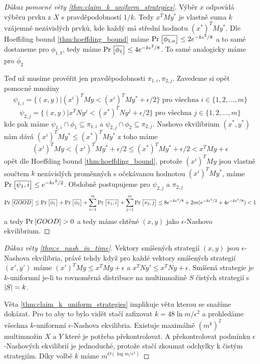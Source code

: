 \begin{proof}[Důkaz pomocné věty \ref{thm:claim_k_uniform_strategies}]
Výběr $x$ odpovídá výběru prvku z $X$ s pravděpodobností $1/k$. 
Tedy $x^T M y^*$ je vlastně suma $k$ vzájemně nezávislých prvků, kde každý má střední hodnotu $(x^*)^T M y^*$. 
Dle Hoeffding bound \ref{thm:hoeffding_bound} máme $\text{Pr}_{}\left[\overline{\phi_{1,a}}\right] \leq  2e^{-k\epsilon^2 /8}$ a to samé dostaneme pro $\phi_{1,b}$, tedy máme $\text{Pr}_{}\left[\overline{\phi_1}\right] \leq 4e^{-k \epsilon^2 /8}$. 
To samé analogicky máme pro $\overline{\phi_2}$

Teď už musíme prověřit jen pravděpodobnosti $\pi_{1,i}, \pi_{2,j}$. Zavedeme si opět pomocné množiny 
$$ 
\psi_{1,i} = \{ (x,y) | (x^i)^T M y < (x^i)^T M y^* + \epsilon/2 \} \text{ pro všechna } i \in \{1,2, \dots, m\}
$$ 
$$ 
\psi_{2,j} = \{ (x,y) | x^T N y^j < (x^*)^T N y^j + \epsilon/2 \} \text{ pro všechna } j \in \{1,2, \dots, m\}
$$
kde pak máme $\psi_{1,i} \cap \phi_1 \subseteq \pi_{1,i}$ a $\psi_{2,j} \cap \phi_2 \subseteq \pi_{2,j}$. 
Nashovo ekvilibrium $(x^*,y^*)$ nám dává $(x^i)^T M y^* \leq (x^*)^T M y^*$ z toho máme 
$$ 
(x^i)^T M y < (x^i)^T M y^* + \epsilon/2 \leq (x^*)^T M y^* + \epsilon /2 < x^T M y + \epsilon 
$$
opět dle Hoeffding bound \ref{thm:hoeffding_bound}, protože $(x^i)^T M y$ jsou vlastně součtem $k$ nezávislých proměnných s očekávanou hodnotou $(x^i)^T M y^*$, máme $\text{Pr}_{}\left[\overline{\psi_1,i}\right] \leq e^{-k \epsilon^2 /2}$. 
Obdobně postupujeme pro $\psi_{2,j}$ a $\pi_{2,j}$
$$
\text{Pr}_{}\left[\overline{GOOD}\right] \leq \text{Pr}_{}\left[\overline{\phi_1}\right] + \text{Pr}_{}\left[\overline{\phi_2}\right] + \sum^m_{i=1} \text{Pr}_{}\left[\overline{\pi_1,i}\right]  + \sum^m_{j=1} \text{Pr}_{}\left[\overline{\pi_2,j}\right] \leq 8e^{-k \epsilon^2 /8} + 2m( e^{-k \epsilon^2 /2} +  4e^{-k \epsilon^2 /8})<1
$$
a tedy $\text{Pr}_{}\left[GOOD\right]>0$ a tedy máme chtěné $(x,y)$ jako $\epsilon$-Nashovo ekvilibrium.
\end{proof}

\begin{proof}[Důkaz věty \ref{thm:e_nash_in_time}]
   Vektory smíšených strategií $(x,y)$ jsou $\epsilon$-Nashova ekvilibria, právě tehdy když pro každé vektory smíšených strategií $(x',y')$ máme $(x')^T M y \leq x^T M y + \epsilon$ a $x^T N y' \leq x^T N y + \epsilon$. 
   Smíšená strategie je $k$-uniformní je-li to rovnoměrná distribuce na multimnožině $S$ čistých strategií s $\left|S\right| = k$. 

   Věta \ref{thm:claim_k_uniform_strategies} implikuje větu kterou se snažíme dokázat. 
   Pro to aby to bylo vidět stačí zafixovat $k = 48 \ln m/\epsilon^2$ a prohledáme všechna $k$-uniformní $\epsilon$-Nashova ekvilibria. 
   Existuje maximálně $(m^k)^2$ multimnožin $X$ a $Y$ které je potřeba překontrolovat. 
   A překontrolovat podmínku $\epsilon$-Nashových ekvilibrií je jednoduché, protože stačí zkoumat odchylky k čistým strategiím. 
   Díky volbě $k$ máme $m^{O(\log m/\epsilon^2)}$
\end{proof}
